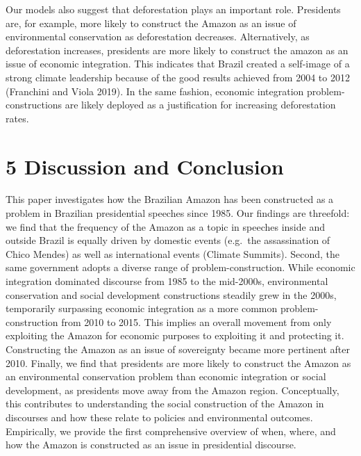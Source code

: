 \documentclass[
  12pt,
]{article}
\begin{document}
Our models also suggest that deforestation plays an important role.
Presidents are, for example, more likely to construct the Amazon as an
issue of environmental conservation as deforestation decreases.
Alternatively, as deforestation increases, presidents are more likely to
construct the amazon as an issue of economic integration. This indicates
that Brazil created a self-image of a strong climate leadership because
of the good results achieved from 2004 to 2012 (Franchini and Viola
2019). In the same fashion, economic integration problem-constructions
are likely deployed as a justification for increasing deforestation
rates.

\hypertarget{discussion-and-conclusion}{%
\section{5 Discussion and Conclusion}\label{discussion-and-conclusion}}

This paper investigates how the Brazilian Amazon has been constructed as
a problem in Brazilian presidential speeches since 1985. Our findings
are threefold: we find that the frequency of the Amazon as a topic in
speeches inside and outside Brazil is equally driven by domestic events
(e.g.~the assassination of Chico Mendes) as well as international events
(Climate Summits). Second, the same government adopts a diverse range of
problem-construction. While economic integration dominated discourse
from 1985 to the mid-2000s, environmental conservation and social
development constructions steadily grew in the 2000s, temporarily
surpassing economic integration as a more common problem-construction
from 2010 to 2015. This implies an overall movement from only exploiting
the Amazon for economic purposes to exploiting it and protecting it.
Constructing the Amazon as an issue of sovereignty became more pertinent
after 2010. Finally, we find that presidents are more likely to
construct the Amazon as an environmental conservation problem than
economic integration or social development, as presidents move away from
the Amazon region. Conceptually, this contributes to understanding the
social construction of the Amazon in discourses and how these relate to
policies and environmental outcomes. Empirically, we provide the first
comprehensive overview of when, where, and how the Amazon is constructed
as an issue in presidential discourse.
\end{document}
